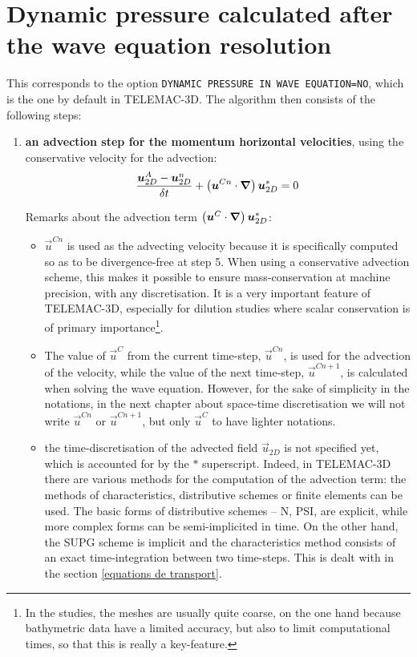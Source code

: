 \section{Dynamic pressure calculated after the wave equation 
resolution}
This corresponds to the option \texttt{DYNAMIC PRESSURE IN WAVE EQUATION=NO}, 
which is the one by default in TELEMAC-3D. The algorithm then consists of 
the following steps:
\begin{enumerate}
\item \textbf{an advection step for the momentum horizontal velocities}, 
using the conservative velocity for the advection:
\begin{equation}
    \dfrac{\vec{u}_{2D}^{A}-\vec{u}_{2D}^n}{\delta t} 
    + \left(\vec{u}^{Cn}\cdot\Grad\right)\vec{u}_{2D}^{*}=0 \medskip \\
\end{equation}
\begin{CommentBlock}{Remarks about the advection term $\left(\bm{u}^{C}\cdot\bm{\nabla}\right)\bm{u}_{2D}^{*}$:}
\begin{itemize}
\item $\vec{u}^{Cn}$ is used as the advecting velocity because it is 
specifically computed so as to be divergence-free at step 5. 
When using a conservative advection scheme, this makes it possible to ensure mass-conservation 
at machine precision, with any discretisation.
It is a very important feature of TELEMAC-3D, especially for dilution studies where scalar conservation is
of primary importance\footnote{In the studies, the meshes are usually quite coarse,
on the one hand because bathymetric data have a limited accuracy, but also to limit
computational times, so that this is really a key-feature.}.
\item The value of $\vec{u}^{C}$ from the current time-step, $\vec{u}^{Cn}$, is used for the advection of the velocity,
while the value of the next time-step, $\vec{u}^{Cn+1}$, is calculated when solving the wave equation.
However, for the sake of simplicity in the notations, in the next chapter about space-time discretisation
we will not write $\vec{u}^{Cn}$ or $\vec{u}^{Cn+1}$, but only $\vec{u}^{C}$ to have lighter notations.
\item the time-discretisation of the advected field $\vec{u}_{2D}$ is not specified yet, which is accounted for by the $*$ superscript. 
Indeed, in TELEMAC-3D there are various methods for the computation
of the advection term: the methods of characteristics, distributive schemes or finite elements can be used.
The basic forms of distributive schemes -- N, PSI, are explicit, while more complex forms can be semi-implicited
in time. On the other hand, the SUPG scheme is implicit and the characteristics method consists of an exact
time-integration between two time-steps. This is dealt with in the section \ref{equations de transport}.
\end{itemize}
\end{CommentBlock}


\end{enumerate}
